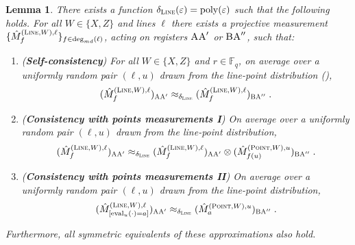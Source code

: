 \documentclass[11pt]{article}
\newtheorem{lemma}[theorem]{Lemma}
\theoremstyle{definition}
\newcommand{\F}{\ensuremath{\mathbb{F}}}
\DeclareMathOperator{\poly}{poly}
\newcommand{\eps}{\varepsilon}
\newcommand{\labelstyle}[1]{\ensuremath{\textsc{#1}}\xspace}
\newcommand{\alice}{\labelstyle{A}}
\newcommand{\bob}{\labelstyle{B}}
\newcommand{\typestyle}[1]{\ensuremath{\textsc{#1}}\xspace}
\renewcommand{\line}{\mathbf{\ell}}
\newcommand{\Point}{\typestyle{Point}}
\newcommand{\Line}{\typestyle{Line}}
\newcommand{\eval}{\mathrm{eval}}
\begin{document}
\begin{lemma}\label{lem:qld-comm-line-cons}
There exists a function $\delta_{\Line}(\eps) = \poly(\eps)$ such that the following holds. 
	For all $W \in \{X,Z\}$ and lines $\line$ there exists a projective measurement $\{ \hat{M}^{(\Line,W),\line}_f \}_{f \in \deg_{md}(\line)}$, acting on registers $\alice\alice'$ or $\bob\alice''$, such that:
	\begin{enumerate}
		\item  (\textbf{Self-consistency})\label{enu:qld-comm-line-self-cons}  For all $W \in \{X,Z\}$ and $r \in \F_q$, on average over a uniformly random  pair $(\line, u)$
                drawn from the line-point distribution
                (),
		\[
			(\hat{M}^{(\Line,W),\line}_f)_{\alice \alice'} \approx_{\delta_\Line} (\hat{M}^{(\Line,W),\line}_f)_{\bob \alice''}\;.
		\]
		
		\item (\textbf{Consistency with points measurements I}) \label{eq:qld-comm-line-pt-cons}
		On average over a uniformly random pair $(\line, u)$
                drawn from the line-point distribution, 
		\[
			(\hat{M}^{(\Line,W),\line}_f)_{\alice \alice'} \approx_{\delta_\Line} (\hat{M}^{(\Line,W),\line}_f)_{\alice \alice'} \otimes (\hat{M}^{(\Point,W),u}_{f(u)})_{\bob \alice''}\;.
		\]		
		\item (\textbf{Consistency with points measurements II}) \label{eq:qld-comm-line-pt-cons2}
		On average over a uniformly random pair $(\line, u)$
                drawn from the line-point distribution,
		\[
			(\hat{M}^{(\Line,W),\line}_{[\eval_u(\cdot) = a]})_{\alice \alice'} \approx_{\delta_\Line}  (\hat{M}^{(\Point,W),u}_{a})_{\bob \alice''}\;.
		\]
              \end{enumerate}
                    Furthermore, all symmetric equivalents of these approximations
      also hold.
\end{lemma}
\end{document}

